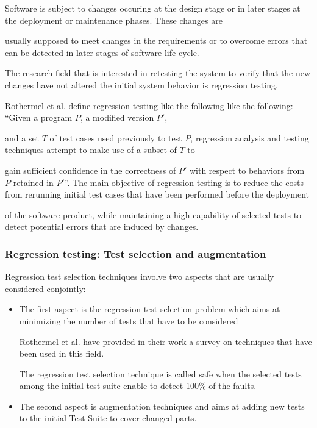 Software is subject to changes occuring at the design stage or in later stages at the deployment or maintenance phases. These changes are 

usually supposed to meet changes in the requirements or to overcome errors that can be detected in later stages of software life cycle. 

The research field that is interested in retesting the system to verify that the new changes have not altered the initial system behavior is regression testing. 

Rothermel et al. \cite{Rothermel:1996:ART:235681.235682} define regression testing like the following 
like the following: ``Given a program $P$, a modified version $P'$, 

and a set $T$ of test cases used previously to test $P$, regression analysis and testing techniques attempt to make use of a subset of $T$ to 

gain sufficient confidence in the correctness of $P'$ with respect to behaviors from $P$ retained in $P'$''.
The main objective of regression testing is to reduce the costs from rerunning initial test cases that have been performed before the deployment 

of the software product, while maintaining a high capability of selected tests to detect potential errors that are induced by changes.


\subsubsection{Regression testing: Test selection and augmentation}

Regression test selection techniques involve two aspects that are usually considered conjointly:
\begin{itemize}
\item The first aspect is the regression test selection problem which aims at minimizing the number of tests that have to be considered 

Rothermel et al. \cite{Rothermel:1996:ART:235681.235682} have provided in their work a survey on techniques that have been used in this field. 

The regression test selection technique is called safe when the selected tests among the initial test suite enable to detect 100\% of the faults.

\item The second aspect is augmentation techniques and aims at adding new tests to the initial Test Suite to cover changed parts.

\end{itemize}

